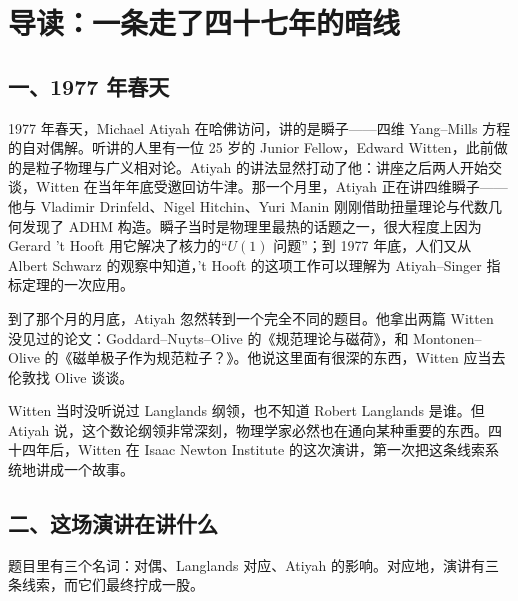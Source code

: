 \clearpage
\section*{导读：一条走了四十七年的暗线}


\subsection*{一、1977 年春天}

1977 年春天，Michael Atiyah 在哈佛访问，讲的是瞬子——四维 Yang--Mills 方程的自对偶解。听讲的人里有一位 25 岁的 Junior Fellow，Edward Witten，此前做的是粒子物理与广义相对论。Atiyah 的讲法显然打动了他：讲座之后两人开始交谈，Witten 在当年年底受邀回访牛津。那一个月里，Atiyah 正在讲四维瞬子——他与 Vladimir Drinfeld、Nigel Hitchin、Yuri Manin 刚刚借助扭量理论与代数几何发现了 ADHM 构造。瞬子当时是物理里最热的话题之一，很大程度上因为 Gerard 't Hooft 用它解决了核力的“$U(1)$ 问题”；到 1977 年底，人们又从 Albert Schwarz 的观察中知道，'t Hooft 的这项工作可以理解为 Atiyah--Singer 指标定理的一次应用。

到了那个月的月底，Atiyah 忽然转到一个完全不同的题目。他拿出两篇 Witten 没见过的论文：Goddard--Nuyts--Olive 的《规范理论与磁荷》，和 Montonen--Olive 的《磁单极子作为规范粒子？》。他说这里面有很深的东西，Witten 应当去伦敦找 Olive 谈谈。

Witten 当时没听说过 Langlands 纲领，也不知道 Robert Langlands 是谁。但 Atiyah 说，这个数论纲领非常深刻，物理学家必然也在通向某种重要的东西。四十四年后，Witten 在 Isaac Newton Institute 的这次演讲，第一次把这条线索系统地讲成一个故事。

\subsection*{二、这场演讲在讲什么}

题目里有三个名词：对偶、Langlands 对应、Atiyah 的影响。对应地，演讲有三条线索，而它们最终拧成一股。

